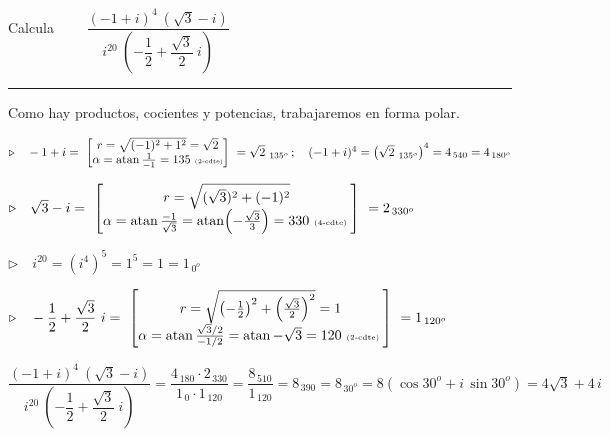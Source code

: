 \begin{miejercicio}

Calcula $\qquad \dfrac
{ (-1+i)^4 \ (\sqrt{3}-i) }
{ i^{20} \ \left( -\dfrac 1 2+\dfrac{\sqrt{3}}{2} \ i  \right) }$

\rule{250pt}{0.5pt}

\vspace{2mm} Como hay  productos, cocientes y potencias, trabajaremos en forma polar.

\vspace{2mm} $\triangleright \quad  -1+i =\  \left[ \mqty{ r=\sqrt{(-1)^2+1^2}=\sqrt{2} \\ \alpha=\atan \frac {1}{-1} = 135 \  \tiny{\text{(2-cdte)}} } \right] \ = \sqrt{2}_{\ 135^o}\, ; \quad (-1+i)^4=\left ( \sqrt{2}_{\ 135^o} \right)^4= 4_{\, 540}=4_{\, 180^o} $

\vspace{2mm}  $\triangleright \quad  \sqrt{3}-i = \ 
\left[ 
\mqty{ 
r=\sqrt{ (\sqrt{3})^2+(-1)^2 } 
\\ 
\alpha=\atan \frac{-1}{\sqrt{3}} = \atan (- \frac{\sqrt{3}}{3}) = 330 \ \tiny{\text{(4-cdte) }}
} 
\right] \ = 2_{\, 330^o}$

\vspace{2mm}  $\triangleright \quad  i^{20} = (i^4)^5=1^5=1=1_{\, 0^o}$

\vspace{2mm}  $\triangleright \quad   -\dfrac 1 2+\dfrac{\sqrt{3}}{2} \ i  = \ 
\left[
\mqty{
r=\sqrt{\left(-\frac 1 2 \right)^2 + \left( \frac{\sqrt{3}}{2} \right)^2 } = 1 
\\
\alpha=\atan \frac{\sqrt{3}/2}{-1/2}=\atan -\sqrt{3}=120 \ \tiny{\text{(2-cdte) }}
}
\right] \ 
= 1_{\, 120^o}$

\vspace{2mm} $\dfrac
{ (-1+i)^4 \ (\sqrt{3}-i) }
{ i^{20} \ \left( -\dfrac 1 2+\dfrac{\sqrt{3}}{2} \ i  \right) } = 
\dfrac{4_{\, 180} \cdot 2_{\, 330}}{1_{\, 0} \cdot 1_{\, 120}}=\dfrac{8_{\, 510}}{1_{\, 120}}=8_{\, 390}=8_{\, 30^o}=8(\cos 30^o+i\, \sin 30^o)=4\sqrt{3}+4\, i$

\end{miejercicio}



